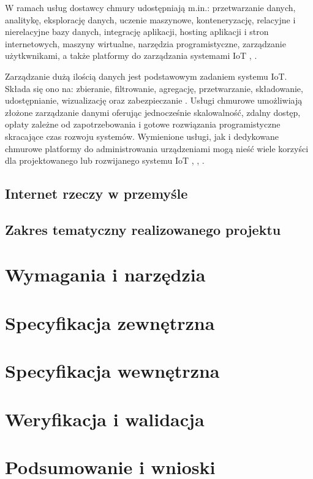 \documentclass[a4paper, 12pt, twoside]{article}
\begin{document}
W ramach usług dostawcy chmury udostępniają m.in.: przetwarzanie danych, 
analitykę, eksplorację danych, uczenie maszynowe, konteneryzację, relacyjne i nierelacyjne
bazy danych, integrację aplikacji, hosting aplikacji i stron internetowych, 
maszyny wirtualne, narzędzia programistyczne, zarządzanie użytkwnikami, a także
platformy do zarządzania systemami IoT \cite{aws}, \cite{azure}.

Zarządzanie dużą ilością danych jest podstawowym zadaniem systemu IoT. Składa się ono
na: zbieranie, filtrowanie, agregację, przetwarzanie, składowanie, udostępnianie,
wizualizację oraz zabezpieczanie \cite{intro-to-iot}. Usługi chmurowe umożliwiają złożone zarządzanie
danymi oferując jednocześnie skalowalność, zdalny dostęp, opłaty zależne od zapotrzebowania
i gotowe rozwiązania programistyczne skracające czas rozwoju systemów. 
Wymienione usługi, jak i dedykowane chmurowe platformy do administrowania 
urządzeniami mogą nieść wiele korzyści dla projektowanego lub rozwijanego
systemu IoT \cite{measuring-value-of-cloud-computing}, \cite{iot-and-cloud}, \cite{iot-in-industrial-sector}. 

\subsection{Internet rzeczy w przemyśle}\label{iiot}

\subsection{Zakres tematyczny realizowanego projektu}


\section{Wymagania i narzędzia}

\section{Specyfikacja zewnętrzna}

\section{Specyfikacja wewnętrzna}

\section{Weryfikacja i walidacja}

\section{Podsumowanie i wnioski}

\printbibliography
\end{document}
